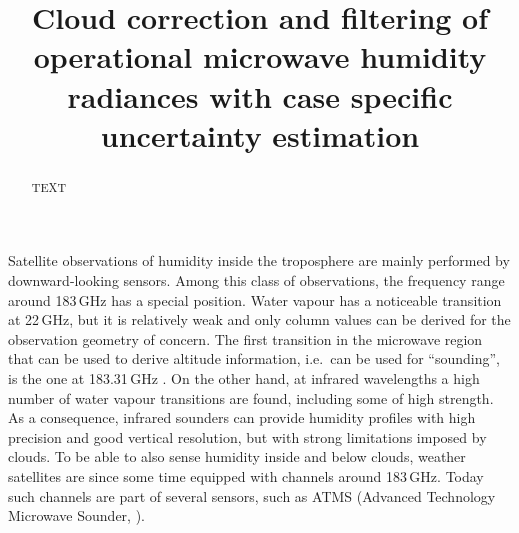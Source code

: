 \documentclass[amt, manuscript]{copernicus}
\begin{document}
\title{Cloud correction and filtering of operational microwave humidity
  radiances with case specific uncertainty estimation}










\maketitle


\begin{abstract}
TEXT
\end{abstract}




\introduction
%
Satellite observations of humidity inside the troposphere are mainly performed
by downward-looking sensors. Among this class of observations, the frequency
range around 183\,GHz has a special position. Water vapour has a noticeable
transition at 22\,GHz, but it is relatively weak and only column values can be
derived \citep[e.g.][]{schluessel1990atmospheric} for the observation geometry
of concern. The first transition in the microwave region that can be used to
derive altitude information, i.e.\ can be used for ``sounding'', is the one at
183.31\,GHz \citep{kakar1983retrieval,wang1983profiling}. On the other hand, at
infrared wavelengths a high number of water vapour transitions are found,
including some of high strength. As a consequence, infrared sounders can
provide humidity profiles with high precision and good vertical resolution, but
with strong limitations imposed by clouds. To be able to also sense humidity
inside and below clouds, weather satellites are since some time equipped with
channels around 183\,GHz. Today such channels are part of several sensors, such
as ATMS (Advanced Technology Microwave Sounder, \citet{weng2012introduction}).
\end{document}
